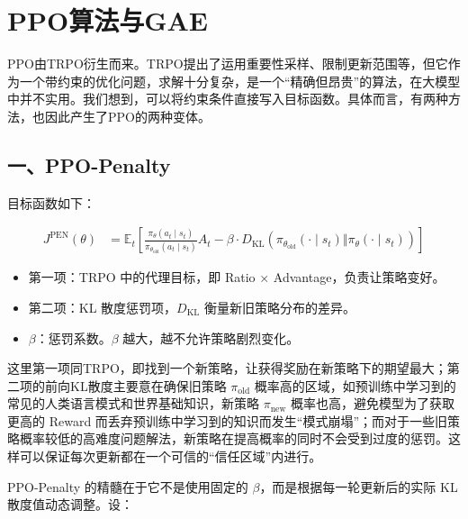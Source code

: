 \setcounter{section}{2}

\hypertarget{ppoux7b97ux6cd5ux4e0egae}{%
\section{PPO算法与GAE}\label{ppoux7b97ux6cd5ux4e0egae}}

PPO由TRPO衍生而来。TRPO提出了运用重要性采样、限制更新范围等，但它作为一个带约束的优化问题，求解十分复杂，是一个``精确但昂贵''的算法，在大模型中并不实用。我们想到，可以将约束条件直接写入目标函数。具体而言，有两种方法，也因此产生了PPO的两种变体。

\hypertarget{ux4e00ppo-penalty}{%
\subsection{一、PPO-Penalty}\label{ux4e00ppo-penalty}}

目标函数如下：

\[
\begin{aligned}
J^{\mathrm{PEN}}(\theta)
&=
\mathbb{E}_t\left[
\frac{\pi_\theta(a_t\mid s_t)}
{\pi_{\theta_{\mathrm{old}}}(a_t\mid s_t)}
A_t
-
\beta\cdot
D_{\mathrm{KL}}\left(
\pi_{\theta_{\mathrm{old}}}(\cdot\mid s_t)
\Vert
\pi_\theta(\cdot\mid s_t)
\right)
\right]
\end{aligned}
\]

\begin{itemize}
\tightlist
\item
  第一项：TRPO 中的代理目标，即 Ratio \(\times\) Advantage，负责让策略变好。
\item
  第二项：KL 散度惩罚项，\(D_{\mathrm{KL}}\) 衡量新旧策略分布的差异。
\item
  \(\beta\)：惩罚系数。\(\beta\) 越大，越不允许策略剧烈变化。
\end{itemize}

这里第一项同TRPO，即找到一个新策略，让获得奖励在新策略下的期望最大；第二项的前向KL散度主要意在确保旧策略 \(\pi_{\mathrm{old}}\) 概率高的区域，如预训练中学习到的常见的人类语言模式和世界基础知识，新策略 \(\pi_{\mathrm{new}}\) 概率也高，避免模型为了获取更高的 Reward 而丢弃预训练中学习到的知识而发生``模式崩塌''；而对于一些旧策略概率较低的高难度问题解法，新策略在提高概率的同时不会受到过度的惩罚。这样可以保证每次更新都在一个可信的``信任区域''内进行。

PPO-Penalty 的精髓在于它不是使用固定的 \(\beta\)，而是根据每一轮更新后的实际 KL 散度值动态调整。设：

